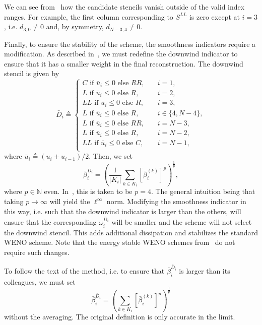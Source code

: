 \documentclass{scrartcl}
\begin{document}
We can see from~ how the candidate stencils vanish
outside of the valid index ranges. For example, the first column corresponding
to $S^{LL}$ is zero except at $i = 3$, i.e. $d_{3, 0} \ne 0$ and, by symmetry,
$d_{N - 3, 4} \ne 0$.

Finally, to ensure the stability of the scheme, the smoothness indicators
require a modification. As described in~\cite{Fisher2011}, we must redefine
the downwind indicator to ensure that it has a smaller weight in the final
reconstruction. The downwind stencil is given by
\[
\bar{D}_i \triangleq
\begin{cases}
    C \text{ if } \bar{u}_i \le 0 \text{ else } RR, &
        \quad i = 1, \\
    L \text{ if } \bar{u}_i \le 0 \text{ else } R, &
        \quad i = 2, \\
    LL \text{ if } \bar{u}_i \le 0 \text{ else } R, &
        \quad i = 3, \\
    L \text{ if } \bar{u}_i \le 0 \text{ else } R, &
        \quad i \in \{4, N - 4\}, \\
    L \text{ if } \bar{u}_i \le 0 \text{ else } RR, &
        \quad i = N - 3, \\
    L \text{ if } \bar{u}_i \le 0 \text{ else } R, &
        \quad i = N - 2, \\
    LL \text{ if } \bar{u}_i \le 0 \text{ else } C, &
        \quad i = N - 1, \\
\end{cases}
\]
where $\bar{u}_i \triangleq (u_i + u_{i - 1}) / 2$. Then, we set
\[
\bar{\beta}^{\bar{D}_i}_i =
\left(
    \frac{1}{|K_i|}
    \sum_{k \in K_i} \left[\bar{\beta}^{(k)}_i\right]^p
\right)^{\frac{1}{p}},
\]
where $p \in \mathbb{N}$ even. In~\cite{Fisher2012}, this is taken to be $p = 4$.
The general intuition being that taking $p \to \infty$ will yield the $\ell^\infty$
norm. Modifying the smoothness indicator in this way, i.e. such that the downwind
indicator is larger than the others, will ensure that the corresponding
$\omega^{\bar{D}_i}_i$ will be smaller and the scheme will not select the
downwind stencil. This adds additional dissipation and stabilizes the standard
WENO scheme. Note that the energy stable WENO schemes from~\cite{Yamaleev2009}
do not require such changes.

\begin{remark}
To follow the text of the method, i.e. to ensure that $\bar{\beta}_i^{\bar{D}_i}$
is larger than its colleagues, we must set
\[
\bar{\beta}^{\bar{D}_i}_i =
\left(
    \sum_{k \in K_i} \left[\bar{\beta}^{(k)}_i\right]^p
\right)^{\frac{1}{p}}
\]
without the averaging. The original definition is only accurate in the limit.
\end{remark}
\end{document}
